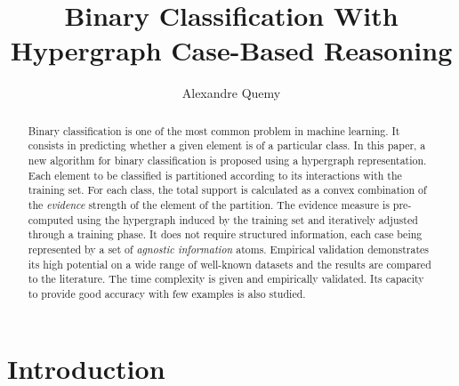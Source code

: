 \documentclass[sigconf,edbt]{acmart-edbt-workshops}
\begin{document}
\title{Binary Classification With Hypergraph Case-Based Reasoning}
  

\author{Alexandre Quemy} 


\renewcommand{\shortauthors}{}


\begin{abstract}
Binary classification is one of the most common problem in machine learning. It consists in predicting whether a given element is of a particular class. In this paper, a new algorithm for binary classification is proposed using a hypergraph representation. Each element to be classified is partitioned according to its interactions with the training set. For each class, the total support is calculated as a convex combination of the {\it evidence} strength of the element of the partition. The evidence measure is pre-computed using the hypergraph induced by the training set and iteratively adjusted through a training phase. It does not require structured information, each case being represented by a set of {\it agnostic information} atoms. Empirical validation demonstrates its high potential on a wide range of well-known datasets and the results are compared to the literature. The time complexity is given and empirically validated. Its capacity to provide good accuracy with few examples is also studied.
\end{abstract}

\maketitle



\section{Introduction}\label{sec:intro}
\end{document}
